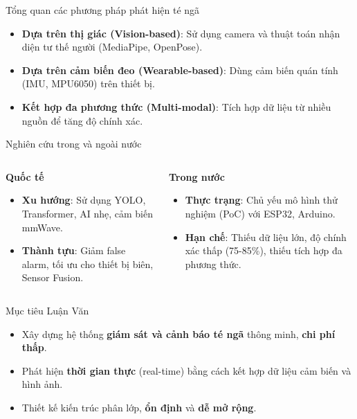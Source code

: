 \begin{frame}{Tổng quan các phương pháp phát hiện té ngã}
    \begin{itemize}
        \item \textbf{Dựa trên thị giác (Vision-based)}: Sử dụng camera và thuật toán nhận diện tư thế người (MediaPipe, OpenPose).
        \item \textbf{Dựa trên cảm biến đeo (Wearable-based)}: Dùng cảm biến quán tính (IMU, MPU6050) trên thiết bị.
        \item \textbf{Kết hợp đa phương thức (Multi-modal)}: Tích hợp dữ liệu từ nhiều nguồn để tăng độ chính xác.
    \end{itemize}
\end{frame}

\begin{frame}{Nghiên cứu trong và ngoài nước}
    \begin{columns}[T]
        \begin{column}{0.48\textwidth}
            \textbf{Quốc tế}
            \begin{itemize}
                \item \textbf{Xu hướng}: Sử dụng YOLO, Transformer, AI nhẹ, cảm biến mmWave.
                \item \textbf{Thành tựu}: Giảm false alarm, tối ưu cho thiết bị biên, Sensor Fusion.
            \end{itemize}
        \end{column}
        \begin{column}{0.48\textwidth}
            \textbf{Trong nước}
            \begin{itemize}
                \item \textbf{Thực trạng}: Chủ yếu mô hình thử nghiệm (PoC) với ESP32, Arduino.
                \item \textbf{Hạn chế}: Thiếu dữ liệu lớn, độ chính xác thấp (75-85\%), thiếu tích hợp đa phương thức.
            \end{itemize}
        \end{column}
    \end{columns}
\end{frame}

\begin{frame}{Mục tiêu Luận Văn}
    \begin{itemize}
        \item Xây dựng hệ thống \textbf{giám sát và cảnh báo té ngã} thông minh, \textbf{chi phí thấp}.
        \item Phát hiện \textbf{thời gian thực} (real-time) bằng cách kết hợp dữ liệu cảm biến và hình ảnh.
        \item Thiết kế kiến trúc phân lớp, \textbf{ổn định} và \textbf{dễ mở rộng}.
    \end{itemize}
\end{frame}

